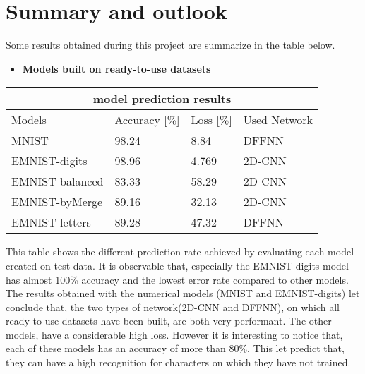 \author{Bautrelle Fotso}
\graphicspath{ {./src/chapters/developer/media/} }

\newpage
\section{Summary and outlook}
Some results obtained during this project are summarize in the table below.

\begin{itemize} \bfseries

\item \textbf{Models built on ready-to-use datasets} \hfill \break

\end{itemize}
  \begin{tabular} {|p{4cm}||p{3cm}|p{3cm}|p{3cm}|} 
    \hline 
    
    \multicolumn{4}{|c|}{model prediction results} \\
    \hline
    Models      &Accuracy [\%] &Loss [\%] &Used Network\\
    
    \hline
    MNIST              &98.24     &8.84     &DFFNN\\
    
    EMNIST-digits      &98.96     &4.769    &2D-CNN\\
    
    EMNIST-balanced    &83.33     &58.29    &2D-CNN\\
    
    EMNIST-byMerge     &89.16     &32.13    &2D-CNN\\
    
    EMNIST-letters     &89.28     &47.32    &DFFNN\\
    
    \hline
   \end{tabular}

   \noindent
This table shows the different prediction rate achieved by evaluating each model created on test data.
It is observable that, especially the EMNIST-digits model has almost 100\% accuracy and 
the lowest error rate compared to other models. 
The results obtained with the numerical models (MNIST and EMNIST-digits) let conclude that, the two types of network(2D-CNN and DFFNN), 
on which all ready-to-use datasets have been built, are both very performant.
The other models, have a considerable high loss.  
However it is interesting to notice that, each of these models has an accuracy of more than 80\%. 
This let predict that, they can have a high recognition for characters on which they have not trained.


